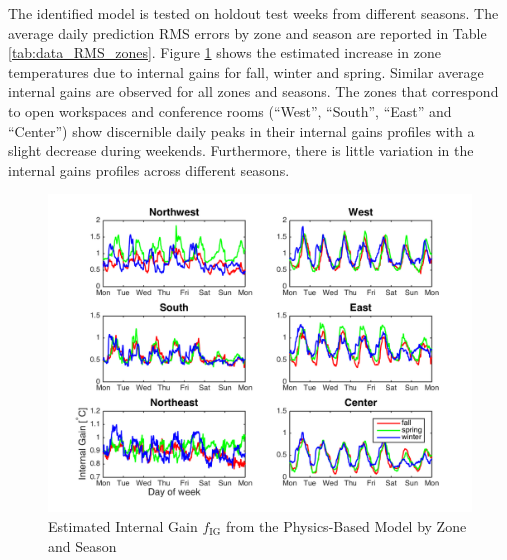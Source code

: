 The identified model is tested on holdout test weeks from different seasons. The average daily prediction RMS errors by zone and season are reported in Table \ref{tab:data_RMS_zones}. Figure \ref{fig:physics_qig} shows the estimated increase in zone temperatures due to internal gains for fall, winter and spring. %
Similar average internal gains are observed for all zones and seasons. The zones that correspond to open workspaces and conference rooms (``West'', ``South'', ``East'' and ``Center'') show discernible daily peaks in their internal gains profiles with a slight decrease during weekends. Furthermore, there is little variation in the internal gains profiles across different seasons.
\begin{figure}
	\centering
	\vspace*{-0.3cm}
	\includegraphics[width=\textwidth]{chapters/building_model/figures/physics_qig.png}
	\vspace*{-0.2cm}
	\caption{Estimated Internal Gain $f_{\text{IG}}$ from the Physics-Based Model by Zone and Season}
	\vspace*{-0.5cm}
	\label{fig:physics_qig}
\end{figure}